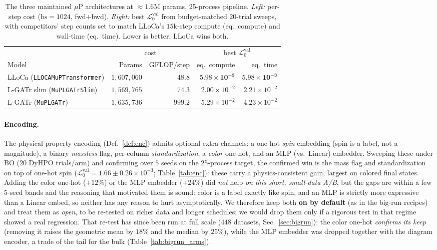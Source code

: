\documentclass[11pt]{article}
\newcommand{\vlnr}{\mathcal{L}^{\mathrm{val}}_{0}}   %
\newcommand{\code}[1]{\texttt{#1}}
\begin{document}
\begin{table}[H]
\centering
\caption{The three maintained $\mu$P architectures at $\approx1.6$M params, 25-process pipeline.
\emph{Left:} per-step cost ($\mathrm{bs}=1024$, fwd$+$bwd). \emph{Right:} best $\vlnr$ from
budget-matched $20$-trial sweeps, with competitors' step counts set to match LLoCa's $15$k-step
compute (eq.\ compute) and wall-time (eq.\ time). Lower is better; LLoCa wins both.}
\label{tab:arch}
\begin{tabular}{@{}lrr@{\hskip 2.2em}rr@{}}
\toprule
 & \multicolumn{2}{c}{cost} & \multicolumn{2}{c}{best $\vlnr$} \\
\cmidrule(r){2-3}\cmidrule(l){4-5}
Model & Params & GFLOP/step & eq.\ compute & eq.\ time \\
\midrule
LLoCa (\code{LLOCAMuPTransformer}) & $1{,}607{,}060$ & $48.8$ & $\mathbf{5.98\times10^{-3}}$ & $\mathbf{5.98\times10^{-3}}$ \\
L-GATr slim (\code{MuPLGATrSlim})  & $1{,}569{,}765$ & $74.3$ & $2.00\times10^{-2}$ & $2.21\times10^{-2}$ \\
L-GATr (\code{MuPLGATr})           & $1{,}635{,}736$ & $999.2$ & $5.29\times10^{-2}$ & $4.23\times10^{-2}$ \\
\bottomrule
\end{tabular}
\end{table}

\paragraph{Encoding.} The physical-property encoding (Def.~\ref{def:enc}) admits optional
extra channels: a one-hot \emph{spin} embedding (spin is a label, not a magnitude), a binary
\emph{massless} flag, per-column \emph{standardization}, a \emph{color} one-hot, and an MLP
(vs.\ Linear) embedder. Sweeping these under BO ($20$ DyHPO trials/arm) and confirming over $5$
seeds on the 25-process target, the confirmed win is the mass flag and standardization on top of
one-hot spin ($\vlnr = 1.66\pm0.26\times10^{-3}$; Table~\ref{tab:enc}): these carry a
physics-consistent gain, largest on colored final states. Adding the color one-hot ($+12\%$) or
the MLP embedder ($+24\%$) did \emph{not} help \emph{on this short, small-data A/B}, but the gaps
are within a few 5-seed bands and the reasoning that motivated them is sound: color is a label
exactly like spin, and an MLP is strictly more expressive than a Linear embed, so neither has any
reason to hurt asymptotically. We therefore keep both \textbf{on by default} (as in the big-run
recipes) and treat them as \emph{open}, to be re-tested on richer data and longer schedules; we
would drop them only if a rigorous test in that regime showed a real regression.
That re-test has since been run at full scale ($448$ datasets, Sec.~\ref{sec:bigrun}): the color
one-hot \emph{confirms its keep} (removing it raises the geometric mean by $18\%$ and the median
by $25\%$), while the MLP embedder was dropped together with the diagram encoder, a trade of the
tail for the bulk (Table~\ref{tab:bigrun_arms}).
\end{document}
